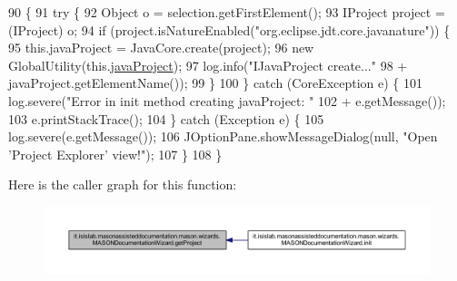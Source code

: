 \begin{DoxyCode}
90                                                            \{
91         \textcolor{keywordflow}{try} \{
92             Object o = selection.getFirstElement();
93             IProject project = (IProject) o;
94             \textcolor{keywordflow}{if} (project.isNatureEnabled(\textcolor{stringliteral}{"org.eclipse.jdt.core.javanature"})) \{
95                 this.javaProject = JavaCore.create(project);
96                 \textcolor{keyword}{new} GlobalUtility(this.\hyperlink{classit_1_1isislab_1_1masonassisteddocumentation_1_1mason_1_1wizards_1_1_m_a_s_o_n_documentation_wizard_a19679a26a6394a719262167ac2c7d0c2}{javaProject});
97                 log.info(\textcolor{stringliteral}{"IJavaProject create..."}
98                         + javaProject.getElementName());
99             \}
100         \} \textcolor{keywordflow}{catch} (CoreException e) \{
101             log.severe(\textcolor{stringliteral}{"Error in init method creating javaProject: "}
102                     + e.getMessage());
103             e.printStackTrace();
104         \} \textcolor{keywordflow}{catch} (Exception e) \{
105             log.severe(e.getMessage());
106             JOptionPane.showMessageDialog(null, \textcolor{stringliteral}{"Open 'Project Explorer' view!"});
107         \}
108     \}
\end{DoxyCode}


Here is the caller graph for this function\-:\nopagebreak
\begin{figure}[H]
\begin{center}
\leavevmode
\includegraphics[width=350pt]{classit_1_1isislab_1_1masonassisteddocumentation_1_1mason_1_1wizards_1_1_m_a_s_o_n_documentation_wizard_ae51cfd5f549a5ad5758567f5d40621b7_icgraph}
\end{center}
\end{figure}


